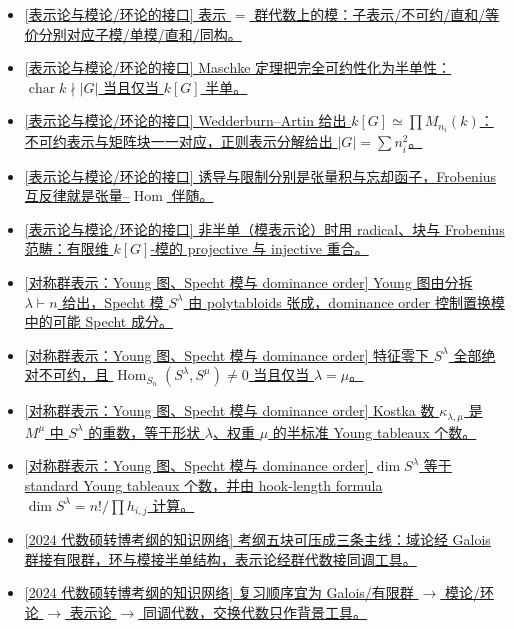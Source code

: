 \documentclass[a4paper]{ctexart}
\theoremstyle{definition}
\theoremstyle{analysis}
\theoremstyle{plain}
\begin{document}
\begin{itemize}
  \item \hyperref[subsec:topic-representation-module-bridge]{[表示论与模论/环论的接口] 表示 \(=\) 群代数上的模：子表示/不可约/直和/等价分别对应子模/单模/直和/同构。}
  \item \hyperref[subsec:topic-representation-module-bridge]{[表示论与模论/环论的接口] Maschke 定理把完全可约性化为半单性：\(\operatorname{char}k\nmid |G|\) 当且仅当 \(k[G]\) 半单。}
  \item \hyperref[subsec:topic-representation-module-bridge]{[表示论与模论/环论的接口] Wedderburn--Artin 给出 \(k[G]\simeq\prod M_{n_i}(k)\)：不可约表示与矩阵块一一对应，正则表示分解给出 \(|G|=\sum n_i^2\)。}
  \item \hyperref[subsec:topic-representation-module-bridge]{[表示论与模论/环论的接口] 诱导与限制分别是张量积与忘却函子，Frobenius 互反律就是张量--\(\operatorname{Hom}\) 伴随。}
  \item \hyperref[subsec:topic-representation-module-bridge]{[表示论与模论/环论的接口] 非半单（模表示论）时用 radical、块与 Frobenius 范畴：有限维 \(k[G]\)-模的 projective 与 injective 重合。}
  \item \hyperref[rem:young-specht-dominance]{[\hyperref[subsec:topic-symmetric-specht]{对称群表示：Young 图、Specht 模与 dominance order}] Young 图由分拆 \(\lambda\vdash n\) 给出，Specht 模 \(S^\lambda\) 由 polytabloids 张成，dominance order 控制置换模中的可能 Specht 成分。}
  \item \hyperref[rem:specht-irreducible-dimension]{[\hyperref[subsec:topic-symmetric-specht]{对称群表示：Young 图、Specht 模与 dominance order}] 特征零下 \(S^\lambda\) 全部绝对不可约，且 \(\operatorname{Hom}_{S_n}(S^\lambda,S^\mu)\neq0\) 当且仅当 \(\lambda=\mu\)。}
  \item \hyperref[rem:kostka-number-detail]{[\hyperref[subsec:topic-symmetric-specht]{对称群表示：Young 图、Specht 模与 dominance order}] Kostka 数 \(\kappa_{\lambda,\mu}\) 是 \(M^\mu\) 中 \(S^\lambda\) 的重数，等于形状 \(\lambda\)、权重 \(\mu\) 的半标准 Young tableaux 个数。}
  \item \hyperref[rem:specht-hook-dimension]{[\hyperref[subsec:topic-symmetric-specht]{对称群表示：Young 图、Specht 模与 dominance order}] \(\dim S^\lambda\) 等于 standard Young tableaux 个数，并由 hook-length formula \(\dim S^\lambda=n!/\prod h_{i,j}\) 计算。}
  \item \hyperref[subsec:topic-qual-syllabus-network]{[2024 代数硕转博考纲的知识网络] 考纲五块可压成三条主线：域论经 Galois 群接有限群，环与模接半单结构，表示论经群代数接同调工具。}
  \item \hyperref[subsec:topic-qual-syllabus-network]{[2024 代数硕转博考纲的知识网络] 复习顺序宜为 Galois/有限群 \(\to\) 模论/环论 \(\to\) 表示论 \(\to\) 同调代数，交换代数只作背景工具。}
\end{itemize}
\end{document}
